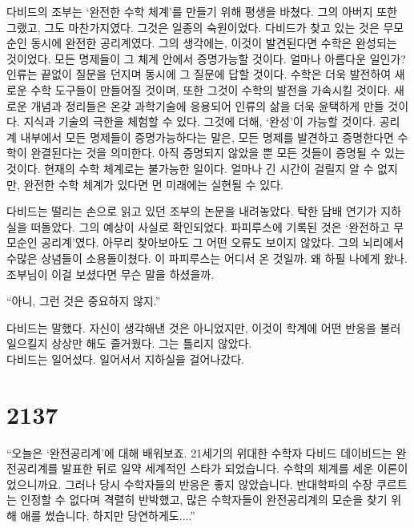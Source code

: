 \documentclass[9pt,showtrims,twoside,openright,chapter]{oblivoir}
\begin{document}
 다비드의 조부는 ‘완전한 수학 체계’를 만들기 위해 평생을 바쳤다. 그의 아버지 또한 그랬고, 그도 마찬가지였다. 그것은 일종의 숙원이었다. 다비드가 찾고 있는 것은 무모순인 동시에 완전한 공리계였다. 그의 생각에는, 이것이 발견된다면 수학은 완성되는 것이었다. 모든 명제들이 그 체계 안에서 증명가능할 것이다. 얼마나 아름다운 일인가? 인류는 끝없이 질문을 던지며 동시에 그 질문에 답할 것이다. 수학은 더욱 발전하여 새로운 수학 도구들이 만들어질 것이며, 또한 그것이 수학의 발전을 가속시킬 것이다. 새로운 개념과 정리들은 온갖 과학기술에 응용되어 인류의 삶을 더욱 윤택하게 만들 것이다. 지식과 기술의 극한을 체험할 수 있다. 
 그것에 더해, ‘완성’이 가능할 것이다. 공리계 내부에서 모든 명제들이 증명가능하다는 말은, 모든 명제를 발견하고 증명한다면 수학이 완결된다는 것을 의미한다. 아직 증명되지 않았을 뿐 모든 것들이 증명될 수 있는 것이다. 현재의 수학 체계로는 불가능한 일이다. 얼마나 긴 시간이 걸릴지 알 수 없지만, 완전한 수학 체계가 있다면 먼 미래에는 실현될 수 있다. 
 \\ \par
 다비드는 떨리는 손으로 읽고 있던 조부의 논문을 내려놓았다. 탁한 담배 연기가 지하실을 떠돌았다. 그의 예상이 사실로 확인되었다. 파피루스에 기록된 것은 ‘완전하고 무모순인 공리계’였다. 아무리 찾아보아도 그 어떤 오류도 보이지 않았다. 그의 뇌리에서 수많은 상념들이 소용돌이쳤다. 이 파피루스는 어디서 온 것일까. 왜 하필 나에게 왔나. 조부님이 이걸 보셨다면 무슨 말을 하셨을까. \par
 “아니, 그런 것은 중요하지 않지.” \par
 다비드는 말했다. 자신이 생각해낸 것은 아니었지만, 이것이 학계에 어떤 반응을 불러일으킬지 상상만 해도 즐거웠다. 그는 틀리지 않았다. \\
다비드는 일어섰다. 일어서서 지하실을 걸어나갔다.
\\
\par
\chapter{2137}

 “오늘은 ‘완전공리계’에 대해 배워보죠. 21세기의 위대한 수학자 다비드 데이비드는 완전공리계를 발표한 뒤로 일약 세계적인 스타가 되었습니다. 수학의 체계를 세운 이론이었으니까요. 그러나 당시 수학자들의 반응은 좋지 않았습니다. 반대학파의 수장 쿠르트는 인정할 수 없다며 격렬히 반박했고, 많은 수학자들이 완전공리계의 모순을 찾기 위해 애를 썼습니다. 하지만 당연하게도....”
 \\
\end{document}
